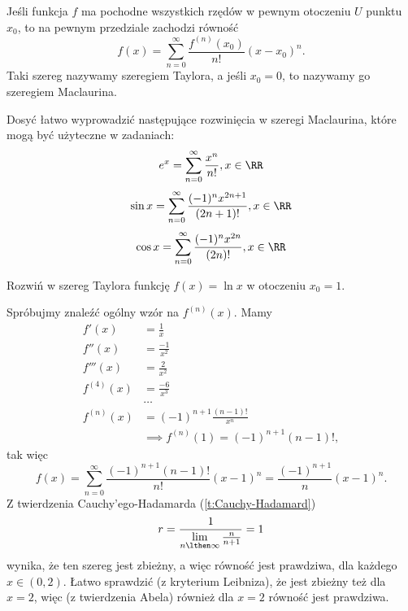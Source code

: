 \begin{theorem}
    Jeśli funkcja $f$ ma pochodne wszystkich rzędów w pewnym otoczeniu $U$ punktu $x_0$, to na pewnym przedziale zachodzi równość
    \[ f(x) = \sum_{n=0}^\infty \frac{f^{(n)}(x_0)}{n!}(x - x_0)^n. \]
    Taki szereg nazywamy szeregiem Taylora, a jeśli $x_0 = 0$, to nazywamy go szeregiem Maclaurina.
\end{theorem}

\begin{fact}
    Dosyć łatwo wyprowadzić następujące rozwinięcia w szeregi Maclaurina, które mogą być użyteczne w zadaniach:
    \[ e^x = \sum_{n=0}^\infty \frac{x^n}{n!}, x \in \RR \]
    \[ \sin{x} = \sum_{n=0}^\infty \frac{(-1)^n x^{2n+1}}{(2n+1)!}, x \in \RR \]
    \[ \cos{x} = \sum_{n=0}^\infty \frac{(-1)^n x^{2n}}{(2n)!}, x \in \RR \]
\end{fact}

\begin{example}
    Rozwiń w szereg Taylora funkcję $f(x) = \ln{x}$ w otoczeniu $x_0 = 1$.
\end{example}
\begin{solution}
    Spróbujmy znaleźć ogólny wzór na $f^{(n)}(x)$. Mamy
    \begin{align*}
        f'(x) &= \frac{1}{x} \\
        f''(x) &= \frac{-1}{x^2} \\
        f'''(x) &= \frac{2}{x^2} \\
        f^{(4)}(x) &= \frac{-6}{x^3} \\
        &\ldots \\
        f^{(n)}(x) &= (-1)^{n+1}\frac{(n-1)!}{x^n} \\
        &\implies f^{(n)}(1) = (-1)^{n+1}(n-1)!,
    \end{align*}
    tak więc
    \[ f(x) = \sum_{n=0}^\infty \frac{(-1)^{n+1}(n-1)!}{n!}(x-1)^n = \frac{(-1)^{n+1}}{n}(x-1)^n. \]
    Z twierdzenia Cauchy'ego-Hadamarda (\ref{t:Cauchy-Hadamard})
    \[ r = \frac{1}{\lim\limits_{n\lthen\infty}\frac{n}{n+1}} = 1 \]
    wynika, że ten szereg jest zbieżny, a więc równość jest prawdziwa, dla każdego $x \in (0, 2)$. Łatwo sprawdzić (z kryterium Leibniza), że jest zbieżny też dla $x = 2$, więc (z twierdzenia Abela) również dla $x = 2$ równość jest prawdziwa.
\end{solution}

